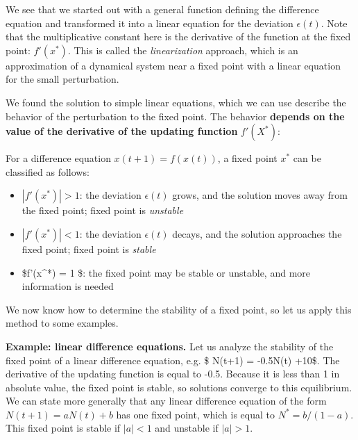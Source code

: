 \documentclass[
  letterpaper,
  DIV=11,
  numbers=noendperiod]{scrreprt}
\begin{document}
We see that we started out with a general function defining the
difference equation and transformed it into a linear equation for the
deviation \(\epsilon(t)\). Note that the multiplicative constant here is
the derivative of the function at the fixed point: \(f'(x^*)\). This is
called the \emph{linearization} approach, which is an approximation of a
dynamical system near a fixed point with a linear equation for the small
perturbation.

We found the solution to simple linear equations, which we can use
describe the behavior of the perturbation to the fixed point. The
behavior \textbf{depends on the value of the derivative of the updating
function} \(f'(X^*)\):

\begin{tcolorbox}[enhanced jigsaw, colbacktitle=quarto-callout-tip-color!10!white, leftrule=.75mm, coltitle=black, left=2mm, breakable, opacityback=0, colback=white, toprule=.15mm, opacitybacktitle=0.6, bottomtitle=1mm, colframe=quarto-callout-tip-color-frame, rightrule=.15mm, bottomrule=.15mm, toptitle=1mm, titlerule=0mm, arc=.35mm, title={Important Fact}]

For a difference equation \(x(t+1) = f(x(t))\), a fixed point \(x^*\)
can be classified as follows:

\begin{itemize}
\item
  \(|f'(x^*)| > 1\): the deviation \(\epsilon(t)\) grows, and the
  solution moves away from the fixed point; fixed point is
  \emph{unstable}
\item
  \(|f'(x^*)| < 1\): the deviation \(\epsilon(t)\) decays, and the
  solution approaches the fixed point; fixed point is \emph{stable}
\item
  \$\textbar f'(x\^{}*)\textbar{} = 1 \$: the fixed point may be stable
  or unstable, and more information is needed
\end{itemize}

\end{tcolorbox}

We now know how to determine the stability of a fixed point, so let us
apply this method to some examples.

\textbf{Example: linear difference equations.} Let us analyze the
stability of the fixed point of a linear difference equation, e.g. \$
N(t+1) = -0.5N(t) +10\$. The derivative of the updating function is
equal to -0.5. Because it is less than 1 in absolute value, the fixed
point is stable, so solutions converge to this equilibrium. We can state
more generally that any linear difference equation of the form
\(N(t+1) = aN(t) + b\) has one fixed point, which is equal to
\(N^* = b/(1-a)\). This fixed point is stable if \(|a| <1\) and unstable
if \(|a|>1\).
\end{document}
